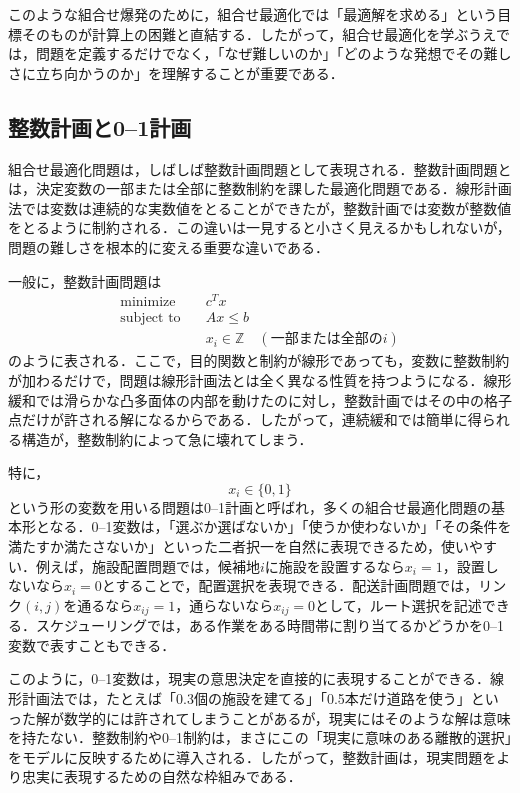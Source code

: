 このような組合せ爆発のために，組合せ最適化では「最適解を求める」という目標そのものが計算上の困難と直結する．したがって，組合せ最適化を学ぶうえでは，問題を定義するだけでなく，「なぜ難しいのか」「どのような発想でその難しさに立ち向かうのか」を理解することが重要である\cite{Holomkovic2015}．
\subsection{整数計画と0--1計画}

組合せ最適化問題は，しばしば整数計画問題として表現される．整数計画問題とは，決定変数の一部または全部に整数制約を課した最適化問題である．線形計画法では変数は連続的な実数値をとることができたが，整数計画では変数が整数値をとるように制約される．この違いは一見すると小さく見えるかもしれないが，問題の難しさを根本的に変える重要な違いである．

一般に，整数計画問題は
\begin{align}
\text{minimize}\quad&c^Tx\\
\text{subject to}\quad&Ax\le b\\
&x_i\in \mathbb{Z}\quad(\text{一部または全部の}i)
\end{align}
のように表される．ここで，目的関数と制約が線形であっても，変数に整数制約が加わるだけで，問題は線形計画法とは全く異なる性質を持つようになる．線形緩和では滑らかな凸多面体の内部を動けたのに対し，整数計画ではその中の格子点だけが許される解になるからである．したがって，連続緩和では簡単に得られる構造が，整数制約によって急に壊れてしまう．

特に，
\begin{equation}
x_i\in \{0,1\}
\end{equation}
という形の変数を用いる問題は0--1計画と呼ばれ，多くの組合せ最適化問題の基本形となる．0--1変数は，「選ぶか選ばないか」「使うか使わないか」「その条件を満たすか満たさないか」といった二者択一を自然に表現できるため，使いやすい．例えば，施設配置問題では，候補地$i$に施設を設置するなら$x_i=1$，設置しないなら$x_i=0$とすることで，配置選択を表現できる．配送計画問題では，リンク$(i,j)$を通るなら$x_{ij}=1$，通らないなら$x_{ij}=0$として，ルート選択を記述できる．スケジューリングでは，ある作業をある時間帯に割り当てるかどうかを0--1変数で表すこともできる．

このように，0--1変数は，現実の意思決定を直接的に表現することができる．線形計画法では，たとえば「0.3個の施設を建てる」「0.5本だけ道路を使う」といった解が数学的には許されてしまうことがあるが，現実にはそのような解は意味を持たない．整数制約や0--1制約は，まさにこの「現実に意味のある離散的選択」をモデルに反映するために導入される．したがって，整数計画は，現実問題をより忠実に表現するための自然な枠組みである．

